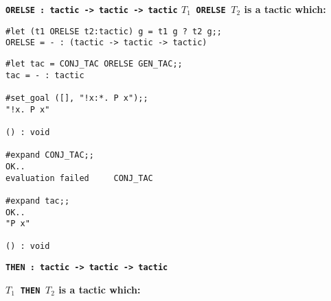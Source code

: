 
\vskip6mm
\bspindent\LARGE\bf
\verb!ORELSE : tactic -> tactic -> tactic!
\espindent
\vskip 7mm
\vskip5mm
\bspindent\LARGE\bf
$T_1\;\;$\verb!ORELSE!$\;\;T_2$
\espindent
\vskip5mm
\bpindent\LARGE\bf
is a tactic which:
\epindent
\vskip 5mm

\vskip 7mm
\vskip 4mm
\begin{session}\begin{verbatim}
#let (t1 ORELSE t2:tactic) g = t1 g ? t2 g;;
ORELSE = - : (tactic -> tactic -> tactic)
\end{verbatim}\end{session}


\vskip 4mm
\begin{session}\begin{verbatim}
#let tac = CONJ_TAC ORELSE GEN_TAC;;
tac = - : tactic

#set_goal ([], "!x:*. P x");;
"!x. P x"

() : void

#expand CONJ_TAC;;
OK..
evaluation failed     CONJ_TAC

#expand tac;;
OK..
"P x"

() : void
\end{verbatim}\end{session}



\vskip6mm
\bspindent\LARGE\bf
\verb!THEN : tactic -> tactic -> tactic!
\espindent

\vskip7mm
\vskip5mm
\bspindent\LARGE\bf
$T_1\;\;$\verb!THEN!$\;\;T_2$
\espindent
\vskip5mm
\bpindent\LARGE\bf
is a tactic which:
\epindent
\vskip 5mm



